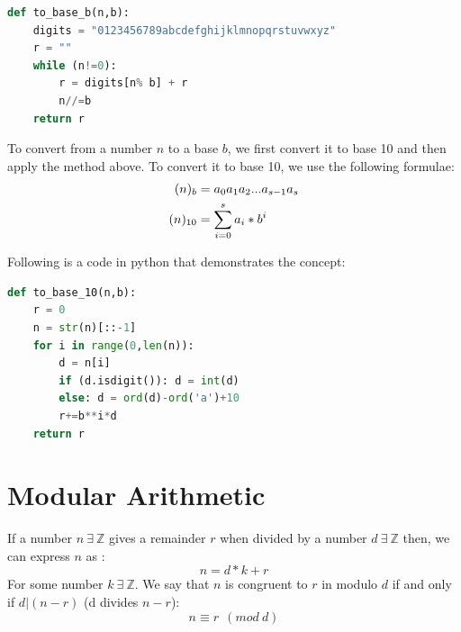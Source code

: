 \documentclass[11pt,twoside]{article}
\theoremstyle{defi}
\begin{document}
\begin{lstlisting}[language=Python]
def to_base_b(n,b):
	digits = "0123456789abcdefghijklmnopqrstuvwxyz"
	r = ""
	while (n!=0):
		r = digits[n% b] + r
		n//=b
	return r
\end{lstlisting}

To convert from a number $n$ to a base $b$, we first convert it to base 10 and then apply the method above. To convert it to base 10, we use the following formulae:
\begin{align}
(n)_b &= a_0a_1a_2...a_{s-1}a_s \notag \\
(n)_{10} &= \sum_{i=0}^sa_i*b^i
\end{align}

Following is a code in python that demonstrates the concept:

\begin{lstlisting}[language=Python]
def to_base_10(n,b):
	r = 0
	n = str(n)[::-1]
	for i in range(0,len(n)):
		d = n[i]
		if (d.isdigit()): d = int(d)
		else: d = ord(d)-ord('a')+10
		r+=b**i*d
	return r
\end{lstlisting}

\newpage

\section{Modular Arithmetic}

\begin{definitionii}
If a number $n\ \exists\ \mathbb{Z}$ gives a remainder $r$ when divided by a number $d\ \exists\ \mathbb{Z}$ then, we can express $n$ as : 
\begin{equation}
n = d*k +r
\end{equation}
For some number $k\ \exists\ \mathbb{Z}$.
We say that $n$ is congruent to $r$ in modulo $d$ if and only if $d|(n-r)$ (d divides $n-r$):
\begin{equation}
n \equiv r\ \ (mod\ d)
\end{equation}
\end{definitionii}
\end{document}
